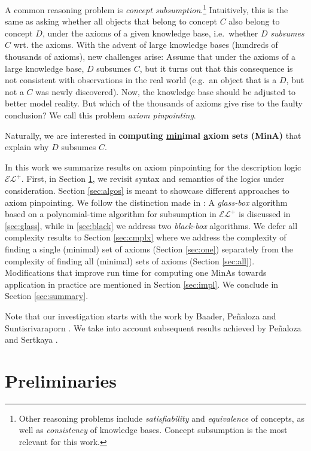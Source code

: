 \documentclass{llncs}
\newcommand{\elp}{\ensuremath{\mathcal{EL^+}}\xspace}
\begin{document}
A common reasoning problem is \emph{concept subsumption}.\footnote{Other reasoning problems include \emph{satisfiability} and \emph{equivalence} of concepts, as well as \emph{consistency} of knowledge bases. Concept subsumption is the most relevant for this work.} Intuitively, this is the same as asking whether all objects that belong to concept $C$ also belong to concept $D$, under the axioms of a given knowledge base, i.e.~whether $D$ \emph{subsumes} $C$ wrt. the axioms. With the advent of large knowledge bases (hundreds of thousands of axioms), new challenges arise: Assume that under the axioms of a large knowledge base, $D$ subsumes $C$, but it turns out that this consequence is not consistent with observations in the real world (e.g.~an object that is a $D$, but not a $C$ was newly discovered). Now, the knowledge base should be adjusted to better model reality. But which of the thousands of axioms give rise to the faulty conclusion? We call this problem \emph{axiom pinpointing}.

Naturally, we are interested in \textbf{computing \underline{min}imal \underline{a}xiom sets (MinA)} that explain why $D$ subsumes $C$.

In this work we summarize results on axiom pinpointing for the description logic \elp. First, in Section \ref{sec:prelim}, we revisit syntax and semantics of the logics under consideration. Section \ref{sec:algos} is meant to showcase different approaches to axiom pinpointing. We follow the distinction made in \cite[Section 1]{family}: A \emph{glass-box} algorithm based on a polynomial-time algorithm for subsumption in \elp is discussed in \ref{sec:glass}, while in \ref{sec:black} we address two \emph{black-box} algorithms. We defer all complexity results to Section \ref{sec:cmplx} where we address the complexity of finding a single (minimal) set of axioms (Section \ref{sec:one}) separately from the complexity of finding all (minimal) sets of axioms (Section \ref{sec:all}). Modifications that improve run time for computing one MinAs towards application in practice are mentioned in Section \ref{sec:impl}. We conclude in Section \ref{sec:summary}.

Note that our investigation starts with the work by Baader, Pe{\~{n}}aloza and Suntisrivaraporn \cite{orig1,orig2}. We take into account subsequent results achieved by Pe{\~{n}}aloza and Sertkaya \cite{hard,family}.

\section{Preliminaries}
\label{sec:prelim}
\end{document}

